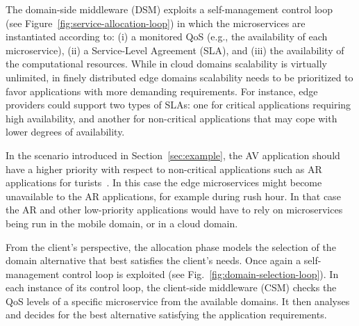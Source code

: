 

The domain-side middleware (DSM) exploits a self-management control loop~\cite{kephart2003vision} (see Figure~\ref{fig:service-allocation-loop}) in which the microservices are instantiated according to: (i) a monitored QoS (e.g., the availability of each microservice), (ii) a Service-Level Agreement (SLA), and (iii) the availability of the computational resources. 
While in cloud domains scalability is virtually unlimited, in finely distributed edge domains scalability needs to be prioritized to favor applications with more demanding requirements. For instance, edge providers could support two types of SLAs: one for critical applications requiring high availability, and another for non-critical applications that may cope with lower degrees of availability.  

In the scenario introduced in Section~\ref{sec:example}, the AV application should have a higher priority with respect to non-critical applications such as AR applications for turists~\cite{GarrigaMendonca2017}. In this case the edge microservices might become unavailable to the AR applications, for example during rush hour. In that case the AR and other low-priority applications would have to rely on microservices being run in the mobile domain, or in a cloud domain.


From the client's perspective, the allocation phase models the selection of the domain alternative that best satisfies the client's needs. Once again a self-management control loop is exploited (see Fig.~\ref{fig:domain-selection-loop}). In each instance of its control loop, the client-side middleware (CSM) checks the QoS levels of a specific microservice from the available domains. It then analyses and decides for the best alternative satisfying the application requirements.

